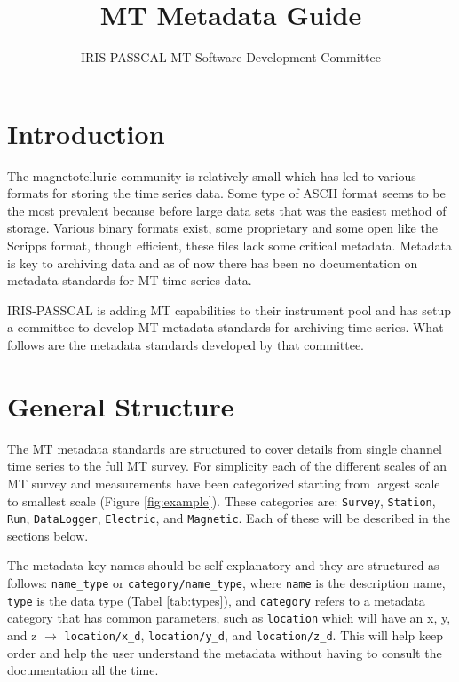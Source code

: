 \documentclass{article}
\title{MT Metadata Guide}
\author[1]{IRIS-PASSCAL MT Software Development Committee}
\affil[1]{IRIS}
\begin{document}
	
\maketitle

\tableofcontents

\newpage

\section{Introduction}

The magnetotelluric community is relatively small which has led to various formats for storing the time series data.  Some type of ASCII format seems to be the most prevalent because before large data sets that was the easiest method of storage. Various binary formats exist, some proprietary and some open like the Scripps format, though efficient, these files lack some critical metadata.  Metadata is key to archiving data and as of now there has been no documentation on metadata standards for MT time series data.  

IRIS-PASSCAL is adding MT capabilities to their instrument pool and has setup a committee to develop MT metadata standards for archiving time series.  What follows are the metadata standards developed by that committee.


\section{General Structure}

The MT metadata standards are structured to cover details from single channel time series to the full MT survey.  For simplicity each of the different scales of an MT survey and measurements have been categorized starting from largest scale to smallest scale (Figure \ref{fig:example}).  These categories are: \verb|Survey|, \verb|Station|, \verb|Run|, \verb|DataLogger|, \verb|Electric|, and \verb|Magnetic|.  Each of these will be described in the sections below.  

The metadata key names should be self explanatory and they are structured as follows: \verb|name_type| or \verb|category/name_type|, where \verb|name| is the description name, \verb|type| is the data type (Tabel \ref{tab:types}), and \verb|category| refers to a metadata category that has common parameters, such as \verb|location| which will have an x, y, and z $\longrightarrow$ \verb|location/x_d|, \verb|location/y_d|, and \verb|location/z_d|. This will help keep order and help the user understand the metadata without having to consult the documentation all the time. 
\end{document}
